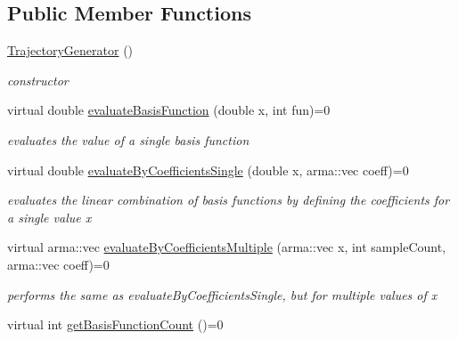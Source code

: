\subsection*{Public Member Functions}
\begin{DoxyCompactItemize}
\item 
\hyperlink{classkukadu_1_1TrajectoryGenerator_ab8e8192c73d62ba4d5d22151f3c3b1a2}{Trajectory\+Generator} ()\hypertarget{classkukadu_1_1TrajectoryGenerator_ab8e8192c73d62ba4d5d22151f3c3b1a2}{}\label{classkukadu_1_1TrajectoryGenerator_ab8e8192c73d62ba4d5d22151f3c3b1a2}

\begin{DoxyCompactList}\small\item\em constructor \end{DoxyCompactList}\item 
virtual double \hyperlink{classkukadu_1_1TrajectoryGenerator_abbd50214ceb85171e7103a1fded7fd91}{evaluate\+Basis\+Function} (double x, int fun)=0
\begin{DoxyCompactList}\small\item\em evaluates the value of a single basis function \end{DoxyCompactList}\item 
virtual double \hyperlink{classkukadu_1_1TrajectoryGenerator_a3cd7129235c868a1cad3d56f3a05ad49}{evaluate\+By\+Coefficients\+Single} (double x, arma\+::vec coeff)=0
\begin{DoxyCompactList}\small\item\em evaluates the linear combination of basis functions by defining the coefficients for a single value x \end{DoxyCompactList}\item 
virtual arma\+::vec \hyperlink{classkukadu_1_1TrajectoryGenerator_a80e470d557ac5fc9a075b582d97bf67b}{evaluate\+By\+Coefficients\+Multiple} (arma\+::vec x, int sample\+Count, arma\+::vec coeff)=0
\begin{DoxyCompactList}\small\item\em performs the same as evaluate\+By\+Coefficients\+Single, but for multiple values of x \end{DoxyCompactList}\item 
virtual int \hyperlink{classkukadu_1_1TrajectoryGenerator_a8204375540872676478a83e2b24da772}{get\+Basis\+Function\+Count} ()=0\hypertarget{classkukadu_1_1TrajectoryGenerator_a8204375540872676478a83e2b24da772}{}\label{classkukadu_1_1TrajectoryGenerator_a8204375540872676478a83e2b24da772}


\end{DoxyCompactItemize}
